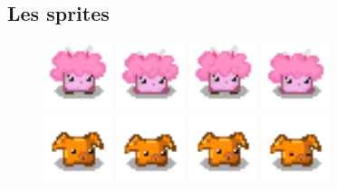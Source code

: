 \documentclass{article}
\begin{document}
    \subsection{Les sprites}
    \begin{figure}[!h]
        \centering
        \includegraphics[height = 2cm]{risette/idle_0.png}
        \includegraphics[height = 2cm]{risette/idle_1.png}
        \includegraphics[height = 2cm]{risette/idle_2.png}
        \includegraphics[height = 2cm]{risette/idle_3.png}
        \\
        \includegraphics[height = 2cm]{haricot/idle_0.png}
        \includegraphics[height = 2cm]{haricot/idle_1.png}
        \includegraphics[height = 2cm]{haricot/idle_2.png}
        \includegraphics[height = 2cm]{haricot/idle_3.png}

\end{figure}
\end{document}
